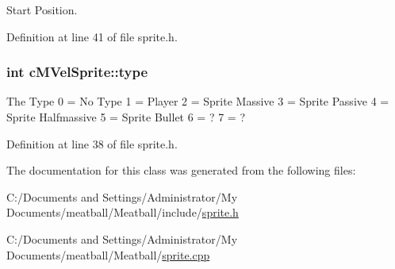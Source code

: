 Start Position. 



Definition at line 41 of file sprite.\-h.

\hypertarget{classc_m_vel_sprite_ab23eadf4d20417f5e5b418cd7cffe8e3}{
\subsubsection[{type}]{\setlength{\rightskip}{0pt plus 5cm}int c\-M\-Vel\-Sprite\-::type}}\label{classc_m_vel_sprite_ab23eadf4d20417f5e5b418cd7cffe8e3}
The Type 0 = No Type 1 = Player 2 = Sprite Massive 3 = Sprite Passive 4 = Sprite Halfmassive 5 = Sprite Bullet 6 = ? 7 = ? 

Definition at line 38 of file sprite.\-h.



The documentation for this class was generated from the following files\-:\begin{DoxyCompactItemize}
\item 
C\-:/\-Documents and Settings/\-Administrator/\-My Documents/meatball/\-Meatball/include/\hyperlink{sprite_8h}{sprite.\-h}\item 
C\-:/\-Documents and Settings/\-Administrator/\-My Documents/meatball/\-Meatball/\hyperlink{sprite_8cpp}{sprite.\-cpp}\end{DoxyCompactItemize}
